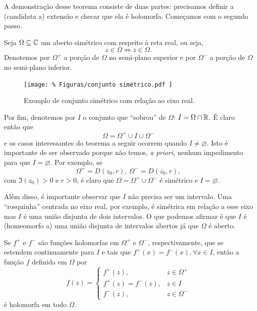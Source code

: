     A demonstração desse teorema consiste de duas partes: precisamos definir a 
    (candidata a) extensão e checar que ela é holomorfa. Começamos com o segundo passo.
    
    Seja $\Omega\subseteq\mathbb{C}$ um aberto simétrico com respeito à reta real, ou seja,
    \begin{equation*}
        z\in\Omega \iff \overline{z}\in\Omega.
    \end{equation*}
    Denotemos por 
    $\Omega^+$ a porção de $\Omega$ no semi-plano superior e por 
    $\Omega^-$ a porção de $\Omega$ no semi-plano inferior.
    \begin{figure}[H]\centering
        \texttt{[image: \%
            Figuras/conjunto simétrico.pdf
        ]}
        \caption{Exemplo de conjunto simétrico com relação ao eixo real.}
    \end{figure}
    Por fim, denotemos por $I$ o conjunto que ``sobrou'' de $\Omega$: 
    $I = \Omega\cap\mathbb{R}$. É claro então que
    \begin{equation*}
        \Omega = \Omega^+ \cup I \cup \Omega^-
    \end{equation*}
    e os casos interessantes do teorema a seguir ocorrem quando $I\neq\varnothing$.
    Isto é importante de ser observado porque não temos, {\it a priori}, nenhum
    impedimento para que $I = \varnothing$. Por exemplo, se
    \begin{equation*}
        \Omega^+ = D(z_0, r), \ \Omega^- = D(\overline{z_0},r),
    \end{equation*}
    com $\Im(z_0) > 0$ e $r > 0$, é claro que $\Omega = \Omega^+\cup\Omega^-$ é simétrico
    e $I = \varnothing$.
    
    Além disso, é importante observar que $I$ não precisa ser um intervalo. Uma
    ``rosquinha'' centrada no eixo real, por exemplo, é simétrica em relação a esse eixo
    mas $I$ é uma união disjunta de dois intervalos. O que podemos afirmar é que
    $I$ é (homeomorfo a) uma união disjunta de intervalos abertos já que $\Omega$ é aberto.
    
    \begin{teorema}
    \label{teo-principio-simetria}
        Se $f^+$ e $f^-$ são funções holomorfas em $\Omega^+$ e $\Omega^-$, respectivamente,
        que se estendem continuamente para $I$ e tais que $f^+(x) = f^-(x), \forall x\in I$,
        então a função $f$ definida em $\Omega$ por
        \begin{equation*}
            f(z) =  \begin{cases}
                      f^+(z),          & z\in\Omega^+ \\
                      f^+(z) = f^-(z), & z\in I       \\
                      f^-(z),          & z\in\Omega^-
                    \end{cases}
        \end{equation*}
        é holomorfa em todo $\Omega$.
    \end{teorema}
    
